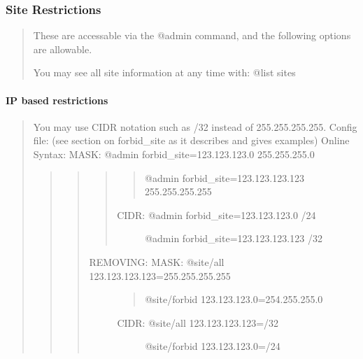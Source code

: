 \documentclass[letterpaper,10pt,english]{sphinxmanual}
\begin{document}
\subsubsection{Site Restrictions}
\label{\detokenize{security:site-restrictions}}\begin{quote}

\sphinxAtStartPar
These are accessable via the @admin command, and the following options are
allowable.

\sphinxAtStartPar
You may see all site information at any time with: @list sites
\end{quote}


\paragraph{IP based restrictions}
\label{\detokenize{security:ip-based-restrictions}}\begin{quote}

\sphinxAtStartPar
You may use CIDR notation such as /32 instead of 255.255.255.255.
Config file:  (see section on forbid\_site as it describes and gives examples)
Online Syntax: MASK: @admin forbid\_site=123.123.123.0 255.255.255.0
\begin{quote}
\begin{quote}
\begin{quote}
\begin{quote}

\sphinxAtStartPar
@admin forbid\_site=123.123.123.123 255.255.255.255
\end{quote}
\begin{description}
\item[{CIDR: @admin forbid\_site=123.123.123.0 /24}] \leavevmode
\sphinxAtStartPar
@admin forbid\_site=123.123.123.123 /32

\end{description}
\end{quote}
\begin{description}
\item[{REMOVING: MASK: @site/all 123.123.123.123=255.255.255.255}] \leavevmode\begin{quote}

\sphinxAtStartPar
@site/forbid 123.123.123.0=254.255.255.0
\end{quote}
\begin{description}
\item[{CIDR: @site/all 123.123.123.123=/32}] \leavevmode
\sphinxAtStartPar
@site/forbid 123.123.123.0=/24


\end{description}
\end{description}
\end{quote}
\end{quote}
\end{quote}
\end{document}
